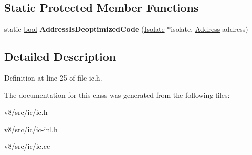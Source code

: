 \subsection*{Static Protected Member Functions}
\begin{DoxyCompactItemize}
\item 
\mbox{\label{classv8_1_1internal_1_1IC_a0fac2b886cc57408920e2ac9180a85cc}} 
static \mbox{\hyperlink{classbool}{bool}} {\bfseries Address\+Is\+Deoptimized\+Code} (\mbox{\hyperlink{classv8_1_1internal_1_1Isolate}{Isolate}} $\ast$isolate, \mbox{\hyperlink{classuintptr__t}{Address}} address)
\end{DoxyCompactItemize}


\subsection{Detailed Description}


Definition at line 25 of file ic.\+h.



The documentation for this class was generated from the following files\+:\begin{DoxyCompactItemize}
\item 
v8/src/ic/ic.\+h\item 
v8/src/ic/ic-\/inl.\+h\item 
v8/src/ic/ic.\+cc\end{DoxyCompactItemize}
